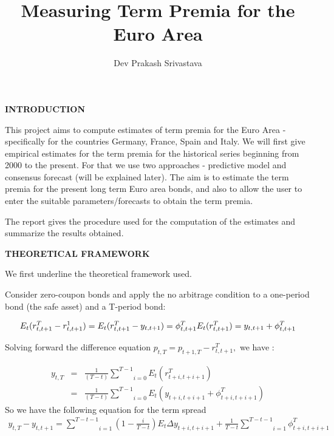 \documentclass[
]{article}
\title{Measuring Term Premia for the Euro Area}
\author{}
\date{\vspace{-2.5em}Dev Prakash Srivastava}
\begin{document}
\maketitle

\bigskip\bigskip

\textbf{INTRODUCTION}

This project aims to compute estimates of term premia for the Euro Area
- specifically for the countries Germany, France, Spain and Italy. We
will first give empirical estimates for the term premia for the
historical series beginning from 2000 to the present. For that we use
two approaches - predictive model and consensus forecast (will be
explained later). The aim is to estimate the term premia for the present
long term Euro area bonds, and also to allow the user to enter the
suitable parameters/forecasts to obtain the term premia.

The report gives the procedure used for the computation of the estimates
and summarize the results obtained.

\bigskip\bigskip

\textbf{THEORETICAL FRAMEWORK}

We first underline the theoretical framework used.

Consider zero-coupon bonds and apply the no arbitrage condition to a
one-period bond (the safe asset) and a T-period bond:

\[ E_{t}( r_{t,t+1}^{T}-r_{t,t+1}^{1}) = E_{t}(
        r_{t,t+1}^{T}-y_{t,t+1}) =\phi _{t,t+1}^{T} \\
        E_{t}( r_{t,t+1}^{T}) = y_{t,t+1}+\phi _{t,t+1}^{T} \]

Solving forward the difference equation
\(p_{t,T}=p_{t+1,T}-r_{t,t+1}^{T},\) we have :

\begin{eqnarray*}
        y_{t,T} &=&\frac{1}{\left( T-t\right) }\underset{i=0}{\overset{T-1}{\sum }}%
        E_{t}\left( r_{t+i,t+i+1}^{T}\right) \\
        &=&\frac{1}{\left( T-t\right) }\underset{i=0}{\overset{T-1}{\sum }}%
        E_{t}\left( y_{t+i,t+i+1}+\phi _{t+i,t+i+1}^{T}\right)
\end{eqnarray*} So we have the following equation for the term spread
\begin{eqnarray*}
    y_{t,T}-y_{t,t+1}= \underset{i=1}{\overset{T-t-1}{\sum}}\left(1-\frac{i}{T-t}\right)E_{t}\Delta y_{t+i,t+i+1}+\frac{1}{T-t}\underset{i=1}{\overset{T-t-1}{\sum }}\phi _{t+i,t+i+1}^{T}
\end{eqnarray*}
\end{document}
